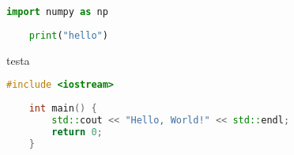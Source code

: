 \begin{lstlisting}[language=Python]
    import numpy as np
    
    print("hello")
    \end{lstlisting}
    testa
    \begin{lstlisting}[language=C++]
    #include <iostream>
    
    int main() {
        std::cout << "Hello, World!" << std::endl;
        return 0;
    }
    \end{lstlisting}
    
    